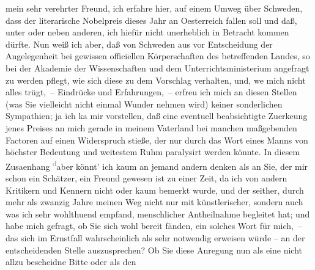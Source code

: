 \pstart{}mein sehr verehrter Freund,\pend\vspace{0.5em}
\pstart
           ich erfahre hier, auf einem Umweg
                  über Schweden, dass der literarische Nobelpreis dieses
               Jahr an Oesterreich fallen soll und daß, unter
               oder neben anderen, ich hiefür nicht unerheblich in Betracht kommen dürfte. Nun weiß
               ich aber, daß von Schweden aus vor Entscheidung
               der Angelegenheit bei gewissen officiellen Körperschaften des betreffenden Landes, so
               bei der Akademie der Wissenschaften und dem Unterrichtsministerium angefragt zu werden pflegt,
               wie sich diese zu dem {\pb}Vorschlag verhalten, und,
                  we{\geminationn} mich nicht alles trügt, – Eindrücke und
               Erfahrungen, – erfreu ich mich an diesen Stellen (was Sie vielleicht nicht einmal
               Wunder nehmen wird) keiner sonderlichen Sympathien; ja ich ka{\geminationn} mir vorstellen, daß eine eventuell beabsichtigte
                  Zuerke{\geminationn}ung jenes Preises an mich gerade in meinem
               Vaterland bei manchen maßgebenden Factoren auf einen Widerspruch stieße, der nur
               durch das Wort eines Manns von höchster Bedeutung und weitestem Ruhm paralysirt
               werden könnte. In diesem Zusa{\geminationm}enhang \substVorne{}\textsuperscript{\textcolor{gray}{d}}\substDazwischen{}a\substHinten{}ber könnt’ ich kaum an jemand andern denken als an Sie, der mir schon ein
               Schätzer, ein {\pb}Freund gewesen ist zu einer Zeit,
               da ich von andern Kritikern und Kennern nicht oder kaum bemerkt wurde, und der
               seither, durch mehr als zwanzig Jahre meinen Weg nicht nur mit künstlerischer,
               sondern \introOben{}auch\introOben{} was ich sehr wohlthuend empfand, menschlicher
               Antheilnahme begleitet hat; und habe mich gefragt, ob Sie sich wohl bereit fänden,
               ein solches Wort für mich, – das sich im Ernstfall wahrscheinlich als sehr notwendig
               erweisen würde – an der entscheidenden Stelle auszusprechen? Ob Sie \introOben{}\introOben{} diese Anregung nun als eine nicht allzu bescheidne Bitte oder als den
